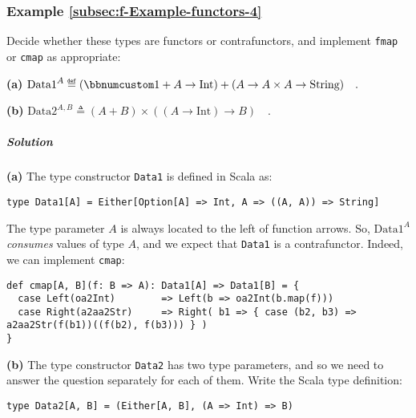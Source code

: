\subsubsection{Example \label{subsec:f-Example-functors-4}\ref{subsec:f-Example-functors-4}}

Decide whether these types are functors or contrafunctors, and implement
\lstinline!fmap! or \lstinline!cmap! as appropriate:

\textbf{(a)} $\text{Data1}^{A}\triangleq\left(\bbnum 1+A\rightarrow\text{Int}\right)+(A\rightarrow A\times A\rightarrow\text{String})\quad.$ 

\textbf{(b)} $\text{Data2}^{A,B}\triangleq\left(A+B\right)\times\left(\left(A\rightarrow\text{Int}\right)\rightarrow B\right)\quad.$

\subparagraph{Solution}

\textbf{(a)} The type constructor \lstinline!Data1! is defined in
Scala as:
\begin{lstlisting}
type Data1[A] = Either[Option[A] => Int, A => ((A, A)) => String]
\end{lstlisting}
The type parameter $A$ is always located to the left of function
arrows. So, $\text{Data1}^{A}$ \emph{consumes} values of type $A$,
and we expect that \lstinline!Data1! is a contrafunctor. Indeed,
we can implement \lstinline!cmap!:
\begin{lstlisting}
def cmap[A, B](f: B => A): Data1[A] => Data1[B] = {
  case Left(oa2Int)        => Left(b => oa2Int(b.map(f)))
  case Right(a2aa2Str)     => Right( b1 => { case (b2, b3) => a2aa2Str(f(b1))((f(b2), f(b3))) } )
}
\end{lstlisting}

\textbf{(b)} The type constructor \lstinline!Data2! has two type
parameters, and so we need to answer the question separately for each
of them. Write the Scala type definition:
\begin{lstlisting}
type Data2[A, B] = (Either[A, B], (A => Int) => B)
\end{lstlisting}

